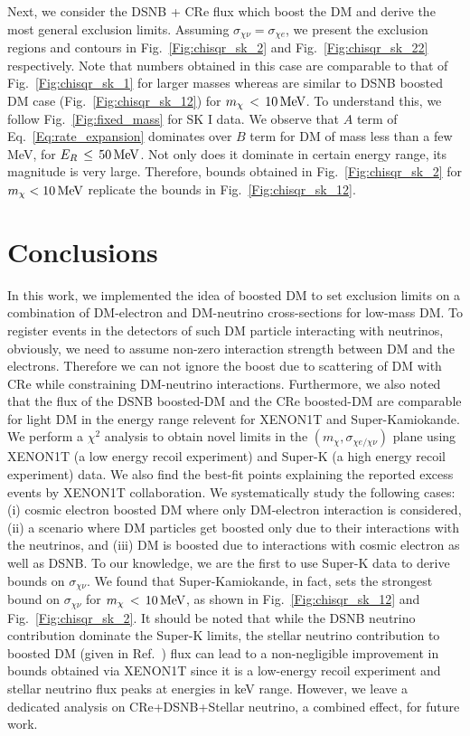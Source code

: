 \documentclass[11pt,prd,twocolumn,nofootinbib,reprint,superscriptaddress,longbibliography,colorlinks=true,citecolor=blue]{revtex4-1}
\begin{document}
Next, we consider the DSNB + CRe flux which boost the DM and derive the most general exclusion limits. Assuming $\sigma_{\chi \nu} = \sigma_{\chi e}$, we present the exclusion regions and contours in Fig.~\ref{Fig:chisqr_sk_2} and Fig.~\ref{Fig:chisqr_sk_22} respectively. Note that numbers obtained in this case are comparable to that of Fig.~\ref{Fig:chisqr_sk_1} for larger masses whereas are similar to DSNB boosted DM case (Fig.~\ref{Fig:chisqr_sk_12}) for $m_\chi\,<\,10\,{\rm MeV}$. To understand this, we follow Fig.~\ref{Fig:fixed_mass} for SK I data. We observe that $A$ term of Eq.~\ref{Eq:rate_expansion} dominates over $B$ term for DM of mass less than a few MeV, for $E_R\,\leq\,50\,{\rm MeV}$. Not only does it dominate in certain energy range, its magnitude is very large. Therefore, bounds obtained in Fig.~\ref{Fig:chisqr_sk_2} for $m_\chi < 10\,{\rm MeV}$ replicate the bounds in Fig.~\ref{Fig:chisqr_sk_12}. 

\section{Conclusions}
In this work, we implemented the idea of boosted DM to set exclusion limits on a combination of DM-electron and DM-neutrino cross-sections for low-mass DM. To register events in the detectors of such DM particle interacting with neutrinos, obviously, we need to assume non-zero interaction strength between DM and the  electrons. Therefore we can not ignore the boost due to scattering of DM with CRe while constraining DM-neutrino interactions. Furthermore, we also noted that the flux of the DSNB boosted-DM and the CRe boosted-DM are comparable for light DM in the energy range relevent for XENON1T and Super-Kamiokande. We perform a $\chi^2$ analysis to obtain novel limits in the $(m_\chi,\sigma_{\chi e/\chi\nu})$ plane using XENON1T (a low energy recoil experiment) and Super-K (a high energy recoil experiment) data. We also find the best-fit points explaining the reported excess events by XENON1T collaboration. We systematically study the following cases: (i) cosmic electron boosted DM where only DM-electron interaction is considered, (ii) a scenario where DM particles get boosted only due to their interactions with the neutrinos, and (iii) DM is boosted due to interactions with cosmic electron as well as DSNB. To our knowledge, we are the first to use Super-K data to derive bounds on $\sigma_{\chi \nu}$. We found that Super-Kamiokande, in fact, sets the strongest bound on $\sigma_{\chi \nu}$ for $m_\chi\,<\,10\,{\rm MeV}$, as shown in Fig.~\ref{Fig:chisqr_sk_12} and Fig.~\ref{Fig:chisqr_sk_2}. { It should be noted that while the DSNB neutrino contribution dominate the Super-K limits, the stellar neutrino contribution to boosted DM (given in Ref.~\cite{Jho:2021rmn}) flux can lead to a non-negligible improvement in bounds obtained via XENON1T since it is a low-energy recoil experiment and stellar neutrino flux peaks at energies in keV range.  However, we leave a dedicated analysis on CRe+DSNB+Stellar neutrino, a combined effect, for future work.}
\end{document}

